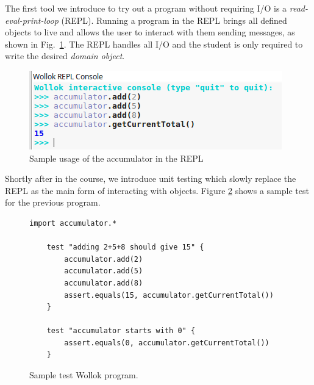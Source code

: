 The first tool we introduce to try out a program without requiring I/O is a \emph {read-eval-print-loop} (REPL). Running a program in the REPL brings all defined objects to live and allows the user to interact with them sending messages, as shown in Fig.~\ref{fig:repl}. 
The REPL handles all I/O and the student is only required to write the desired \emph{domain object}.

\begin{figure}[ht]
 \centering
 \includegraphics[scale=0.6]{images/accumulator-repl.png}
 \caption{\small Sample usage of the accumulator  in the REPL}
 \label{fig:repl}
\end{figure}




Shortly after in the course, we introduce unit testing which slowly replace the REPL as the main form of interacting with objects. Figure \ref{fig:test} shows a sample test for the previous program. 

\begin{figure}[ht]
 \centering
 \begin{lstlisting}[language=Wollok]
 	import accumulator.*

	test "adding 2+5+8 should give 15" {
		accumulator.add(2)
		accumulator.add(5)
		accumulator.add(8)
		assert.equals(15, accumulator.getCurrentTotal())		
	}
   
	test "accumulator starts with 0" {
		assert.equals(0, accumulator.getCurrentTotal())
	}
 \end{lstlisting}
 
 \caption{\small Sample test Wollok program.}
 \label{fig:test}
\end{figure}

